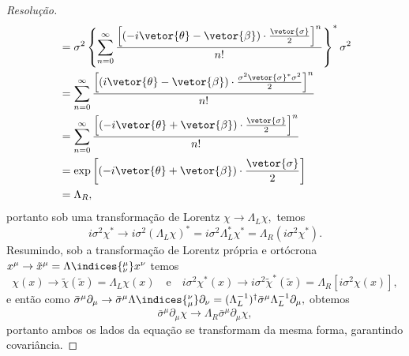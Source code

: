 \begin{proof}[Resolução]
\begin{align*}
                                      &= \sigma^2 \left\{\sum_{n = 0}^\infty \frac{\left[(-i\vetor{\theta} - \vetor{\beta})\cdot\frac{\vetor{\sigma}}{2}\right]^n}{n!}\right\}^* \sigma^2\\
                                      &= \sum_{n = 0}^\infty \frac{\left[(i \vetor{\theta} - \vetor{\beta}) \cdot \frac{\sigma^2\vetor{\sigma}^*\sigma^2}{2}\right]^n}{n!}\\
                                      &= \sum_{n = 0}^\infty \frac{\left[(-i \vetor{\theta} + \vetor{\beta}) \cdot \frac{\vetor{\sigma}}{2}\right]^n}{n!}\\
                                      &= \exp\left[(-i \vetor{\theta} + \vetor{\beta}) \cdot \frac{\vetor{\sigma}}{2}\right]\\
                                      &= \Lambda_R,
    \end{align*}
    portanto sob uma transformação de Lorentz \(\chi \to \Lambda_L \chi,\) temos
    \begin{equation*}
        i \sigma^2 \chi^* \to i \sigma^2 (\Lambda_L \chi)^* = i \sigma^2 \Lambda_L^* \chi^* = \Lambda_R(i \sigma^2 \chi^*).
    \end{equation*}
    Resumindo, sob a transformação de Lorentz própria e ortócrona \(x^\mu \to \tilde{x}^\mu = \Lambda\indices{^\mu_\nu} x^\nu\) temos
    \begin{equation*}
        \chi(x) \to \tilde{\chi}(\tilde{x}) = \Lambda_L \chi(x)
        \quad\text{e}\quad
        i \sigma^2 \chi^*(x) \to i\sigma^2 \tilde{\chi}^*(\tilde{x}) = \Lambda_R [i \sigma^2 \chi(x)],
    \end{equation*}
    e então como \(\bar{\sigma}^\mu \partial_\mu \to \bar{\sigma}^\mu \Lambda\indices{^\nu_\mu} \partial_\nu = (\Lambda_L^{-1})^\dag \bar{\sigma}^\mu \Lambda_L^{-1} \partial_\mu,\) obtemos
    \begin{equation*}
        \bar{\sigma}^\mu \partial_\mu \chi \to \Lambda_R \bar{\sigma}^\mu \partial_\mu \chi,
    \end{equation*}
    portanto ambos os lados da equação se transformam da mesma forma, garantindo covariância.
\end{proof}
